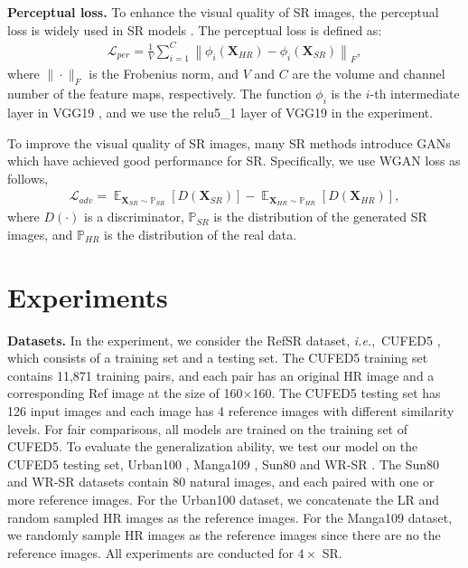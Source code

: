 \documentclass[runningheads]{llncs}
\def\ie{\mbox{\textit{i.e.}, }}
\def\mL{{\mathcal L}}
\def\bX{{\bm{X}}}
\def\mmE{{\mathbb E}}
\def\mmP{{\mathbb P}}
\begin{document}
\noindent\textbf{Perceptual loss.}
To enhance the visual quality of SR images, the perceptual loss is widely used in SR models \cite{zhang2019image,jiang2021robust}.
The perceptual loss is defined as:
\begin{align}
    \mL_{per} = \frac{1}{V} \sum\nolimits_{i=1}^C \left\| \phi_i(\bX_{HR}) - \phi_i(\bX_{SR}) \right\|_F,
\end{align}
where $\|{\cdot}\|_F$ is the Frobenius norm, and $V$ and $C$ are the volume and channel number of the feature maps, respectively.
The function $\phi_i$ is the $i$-th intermediate layer in VGG19 \cite{simonyan2014very}, and we use the relu5\_1 layer of VGG19 in the experiment.

To improve the visual quality of SR images, many SR methods \cite{ledig2017photo,wang2018esrgan} introduce GANs \cite{goodfellow2014GAN,arjovsky2017wasserstein} which have achieved good performance for SR.
Specifically, we use WGAN \cite{arjovsky2017wasserstein} loss as follows,
\begin{equation}
\begin{aligned}
    \mL_{adv} {=} \mathop{\mmE}\nolimits_{{\bX}_{SR} \sim \mmP_{SR}} [D({\bX}_{SR})] - \mathop{\mmE}\nolimits_{\bX_{H\!R} {\sim} \mmP_{H\!R}} [D(\bX_{HR})],
\end{aligned}
\label{eqn:adv_loss}
\end{equation}
where $D(\cdot)$ is a discriminator, $\mmP_{SR}$ is the distribution of the generated SR images, and $\mmP_{H\!R}$ is the distribution of the real data.



\section{Experiments}

\noindent\textbf{Datasets.}
In the experiment, we consider the RefSR dataset, \ie CUFED5 \cite{zhang2019image}, which consists of a training set and a testing set.
The CUFED5 training set contains 11,871 training pairs, and each pair has an original HR image and a corresponding Ref image at the size of 160${\times}$160. 
The CUFED5 testing set has 126 input images and each image has 4 reference images with different similarity levels.
For fair comparisons, all models are trained on the training set of CUFED5. 
To evaluate the generalization ability, we test our model on the CUFED5 testing set, Urban100 \cite{huang2015single}, Manga109 \cite{matsui2017sketch}, Sun80 \cite{sun2012super} and WR-SR \cite{jiang2021robust}.
The Sun80 and WR-SR datasets contain 80 natural images, and each paired with one or more reference images.  
For the Urban100 dataset, we concatenate the LR and random sampled HR images as the reference images.
For the Manga109 dataset, we randomly sample HR images as the reference images since there are no the reference images. 
All experiments are conducted for $4\times$ SR.
\end{document}

